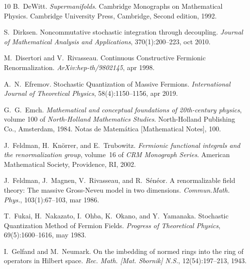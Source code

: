 \documentclass{article}
\newcommand{\tmtextit}[1]{{\itshape{#1}}}
\begin{document}
\begin{thebibliography}{10}
  B.~DeWitt. {\newblock}\tmtextit{Supermanifolds}.
  {\newblock}Cambridge Monographs on Mathematical Physics. Cambridge
  University Press, Cambridge, Second  edition, 1992.{\newblock}
  
  S.~Dirksen.
  {\newblock}Noncommutative stochastic integration through decoupling.
  {\newblock}\tmtextit{Journal of Mathematical Analysis and Applications},
  370(1):200--223, oct 2010.{\newblock}
  
  M.~Disertori  and  V.~Rivasseau.
  {\newblock}Continuous Constructive Fermionic Renormalization.
  {\newblock}\tmtextit{ArXiv:hep-th/9802145}, apr 1998.{\newblock}
  
  A.~N.~Efremov. {\newblock}Stochastic
  Quantization of Massive Fermions. {\newblock}\tmtextit{International Journal
  of Theoretical Physics}, 58(4):1150--1156, apr 2019.{\newblock}
  
  G.~G.~Emch. {\newblock}\tmtextit{Mathematical and
  conceptual foundations of 20th-century physics},  volume  100  of
  \tmtextit{North-Holland Mathematics Studies}. {\newblock}North-Holland
  Publishing Co., Amsterdam, 1984. {\newblock}Notas de Matem{\'a}tica
  [Mathematical Notes], 100.{\newblock}
  
  J.~Feldman, H.~Kn{\"o}rrer, and  E.~Trubowitz.
  {\newblock}\tmtextit{Fermionic functional integrals and the renormalization
  group},  volume~16  of \tmtextit{CRM Monograph Series}. {\newblock}American
  Mathematical Society, Providence, RI, 2002.{\newblock}
  
  J.~Feldman, J.~Magnen,
  V.~Rivasseau, and  R.~S{\'e}n{\'e}or. {\newblock}A renormalizable field
  theory: The massive Gross-Neveu model in two dimensions.
  {\newblock}\tmtextit{Commun.Math. Phys.}, 103(1):67--103, mar
  1986.{\newblock}
  
  T.~Fukai, H.~Nakazato, I.~Ohba, K.~Okano,
  and  Y.~Yamanaka. {\newblock}Stochastic Quantization Method of Fermion
  Fields. {\newblock}\tmtextit{Progress of Theoretical Physics},
  69(5):1600--1616, may 1983.{\newblock}
  
  I.~Gelfand  and  M.~Neumark. {\newblock}On the
  imbedding of normed rings into the ring of operators in Hilbert space.
  {\newblock}\tmtextit{Rec. Math. [Mat. Sbornik] N.S.}, 12(54):197--213,
  1943.{\newblock}
  

\end{thebibliography}
\end{document}
